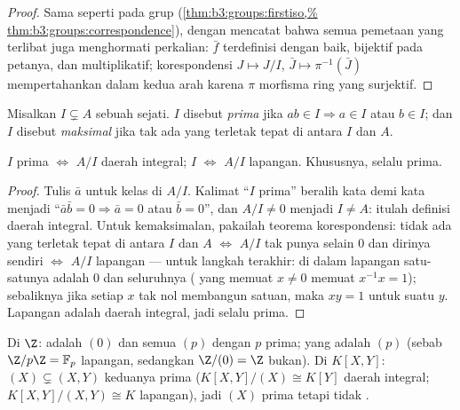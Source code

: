 \begin{proof}
Sama seperti pada grup (\cref{thm:b3:groups:firstiso,%
thm:b3:groups:correspondence}), dengan mencatat bahwa semua pemetaan yang terlibat juga
menghormati perkalian: $\bar f$ terdefinisi dengan baik, bijektif pada
petanya, dan multiplikatif; korespondensi $J \mapsto J/I$,
$\bar J \mapsto \pi^{-1}(\bar J)$ mempertahankan  dalam kedua
arah karena $\pi$ morfisma ring yang surjektif.
\end{proof}

\begin{definition}\label{def:b3:rings:primemaximal}
Misalkan $I \subsetneq A$ sebuah  sejati.  $I$ disebut
\emph{prima} jika $ab \in I \Rightarrow a \in I$
atau $b \in I$; dan $I$ disebut \emph{maksimal} jika tak ada
 yang terletak tepat di antara $I$ dan $A$.
\end{definition}

\begin{proposition}\label{prop:b3:rings:primemaximal}
$I$ prima $\iff$ $A/I$ daerah integral; $I$ 
$\iff$ $A/I$ lapangan. Khususnya,  selalu prima.
\end{proposition}

\begin{proof}
Tulis $\bar a$ untuk kelas di $A/I$. Kalimat ``$I$ prima'' beralih
kata demi kata menjadi ``$\bar a\bar b = 0 \Rightarrow \bar a = 0$ atau $\bar b
= 0$'', dan $A/I \neq 0$ menjadi $I \neq A$: itulah definisi
daerah integral. Untuk kemaksimalan, pakailah teorema korespondensi: tidak ada 
yang terletak tepat di antara $I$ dan $A$ $\iff$ $A/I$ tak punya  selain
$0$ dan dirinya sendiri $\iff$ $A/I$ lapangan --- untuk langkah terakhir: di dalam
lapangan satu-satunya  adalah $0$ dan seluruhnya ( yang memuat
$x \ne 0$ memuat $x^{-1}x = 1$); sebaliknya jika setiap $x$ tak nol
membangun  satuan, maka $xy = 1$ untuk suatu $y$. Lapangan adalah
daerah integral, jadi  selalu prima.
\end{proof}

\begin{example}\label{ex:b3:rings:primemaximal}
Di $\Z$:  adalah $(0)$ dan semua $(p)$ dengan $p$ prima;
yang  adalah $(p)$ (sebab $\Z/p\Z = \mathbb F_p$ lapangan, sedangkan
$\Z/(0) = \Z$ bukan). Di $K[X, Y]$: $(X) \subsetneq (X, Y)$ keduanya
prima ($K[X,Y]/(X) \cong K[Y]$ daerah integral;
$K[X,Y]/(X,Y) \cong K$ lapangan), jadi $(X)$ prima tetapi tidak
.
\end{example}

